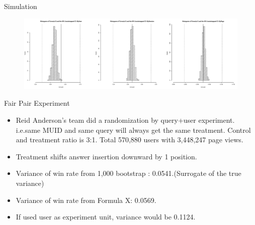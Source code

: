 \documentclass[xcolor=x11names,table]{beamer}
\begin{document}
  \begin{frame}{Simulation}
\begin{figure}[!htbp]
  \centering
  \includegraphics[width=1\textwidth]{jsm2}
\end{figure}
\end{frame}
 
  \begin{frame}{Fair Pair Experiment}
\begin{itemize}
\item  Reid Anderson's team did a randomization by query+user experiment. i.e.same MUID and same query will always get the same treatment. Control and treatment ratio is 3:1. Total 570,880 users with 3,448,247 page views.
\item Treatment  shifts answer insertion downward by 1 position.
\item Variance of win rate from 1,000 bootstrap : 0.0541.(Surrogate of the true variance)
\item Variance of win rate from Formula X: 0.0569.
\item If used user as experiment unit, variance would be 0.1124. 
\end{itemize}
\end{frame}
 

  
 
\end{document}
